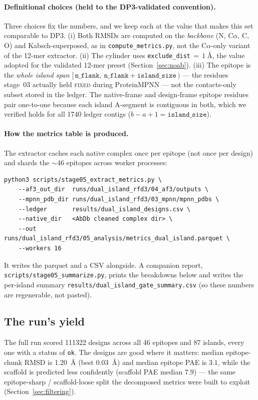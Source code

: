 \paragraph{Definitional choices (held to the DP3-validated convention).}
Three choices fix the numbers, and we keep each at the value that makes this set comparable to
DP3. (i) Both RMSDs are computed on the \emph{backbone} (N, C$\alpha$, C, O) and
Kabsch-superposed, as in \texttt{compute\_metrics.py}, not the C$\alpha$-only variant of the
12-mer extractor. (ii) The cylinder uses \texttt{exclude\_dist}\,$=\,\SI{1}{\angstrom}$, the
value adopted for the validated 12-mer preset (Section~\ref{sec:noab}). (iii) The epitope is
the \emph{whole island span} $[\,\texttt{n\_flank},\ \texttt{n\_flank}+\texttt{island\_size}\,)$
--- the residues stage~03 actually held \textsc{fixed} during ProteinMPNN --- not the
contacts-only subset stored in the ledger. The native-frame and design-frame epitope residues
pair one-to-one because each island A-segment is contiguous in both, which we verified holds
for all \num{1740} ledger contigs ($b-a+1=\texttt{island\_size}$).

\paragraph{How the metrics table is produced.}
The extractor caches each native complex once per epitope (not once per design) and shards the
$\sim$46 epitopes across worker processes:
\begin{verbatim}
python3 scripts/stage05_extract_metrics.py \
    --af3_out_dir  runs/dual_island_rfd3/04_af3/outputs \
    --mpnn_pdb_dir runs/dual_island_rfd3/03_mpnn/mpnn_pdbs \
    --ledger       results/dual_island_designs.csv \
    --native_dir   <AbDb cleaned complex dir> \
    --out          runs/dual_island_rfd3/05_analysis/metrics_dual_island.parquet \
    --workers 16
\end{verbatim}
It writes the parquet and a CSV alongside. A companion report,
\texttt{scripts/stage05\_summarize.py}, prints the breakdowns below and writes the per-island
summary \texttt{results/dual\_island\_gate\_summary.csv} (so these numbers are regenerable,
not pasted).

\subsection{The run's yield}\label{sec:metricsresults}
The full run scored \num{111322} designs across all 46 epitopes and 87 islands, every one with
a status of \texttt{ok}. The designs are good where it matters: median epitope-chunk RMSD is
\SI{1.20}{\angstrom} (best \SI{0.03}{\angstrom}) and median epitope PAE is $3.1$, while the
scaffold is predicted less confidently (scaffold PAE median $7.9$) --- the same
epitope-sharp / scaffold-loose split the decomposed metrics were built to exploit
(Section~\ref{sec:filtering}).

